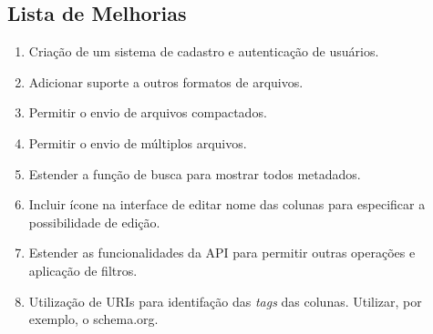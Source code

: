 
\begin{apendicesenv}
\partapendices






\chapter{Lista de Melhorias}
\label{apendiceB}

\begin{enumerate}  
    \item Criação de um sistema de cadastro e autenticação de usuários. 
    \item Adicionar suporte a outros formatos de arquivos. 
    \item Permitir o envio de arquivos compactados.
    \item Permitir o envio de múltiplos arquivos.
    \item Estender a função de busca para mostrar todos metadados.
    \item Incluir ícone na interface de editar nome das colunas para especificar a possibilidade de edição.
    \item Estender as funcionalidades da API para permitir outras operações e aplicação de filtros.
    \item Utilização de URIs para identifação das \textit{tags} das colunas. Utilizar, por exemplo, o schema.org.
\end{enumerate}

\end{apendicesenv}
